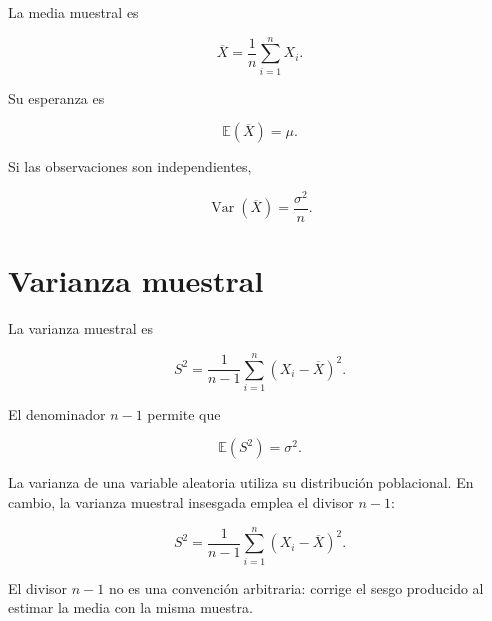 \documentclass[
  spanish,
  10.5pt,
  letterpaper,
  DIV=11,
  numbers=noendperiod,
  oneside,
  open=any]{scrreprt}
\theoremstyle{definition}
\theoremstyle{definition}
\theoremstyle{plain}
\theoremstyle{remark}
\begin{document}

La media muestral es

\[
\overline{X}
=
\frac{1}{n}
\sum_{i=1}^{n}X_i.
\]

Su esperanza es

\[
\mathbb{E}(\overline{X})
=
\mu.
\]

Si las observaciones son independientes,

\[
\operatorname{Var}(\overline{X})
=
\frac{\sigma^2}{n}.
\]

\section*{Varianza muestral}\label{varianza-muestral}


La varianza muestral es

\[
S^2
=
\frac{1}{n-1}
\sum_{i=1}^{n}
(X_i-\overline{X})^2.
\]

El denominador \(n-1\) permite que

\[
\mathbb{E}(S^2)=\sigma^2.
\]

\begin{tcolorbox}[enhanced jigsaw, arc=.35mm, bottomrule=.15mm, bottomtitle=1mm, breakable, colback=white, colbacktitle=quarto-callout-note-color!10!white, colframe=quarto-callout-note-color-frame, coltitle=black, left=2mm, leftrule=.75mm, opacityback=0, opacitybacktitle=0.6, rightrule=.15mm, title=\textcolor{quarto-callout-note-color}{\faInfo}\hspace{0.5em}{Varianza poblacional y varianza muestral}, titlerule=0mm, toprule=.15mm, toptitle=1mm]

La varianza de una variable aleatoria utiliza su distribución
poblacional. En cambio, la varianza muestral insesgada emplea el divisor
\(n-1\):

\[
S^2
=
\frac{1}{n-1}
\sum_{i=1}^{n}
(X_i-\overline{X})^2.
\]

El divisor \(n-1\) no es una convención arbitraria: corrige el sesgo
producido al estimar la media con la misma muestra.

\end{tcolorbox}
\end{document}
